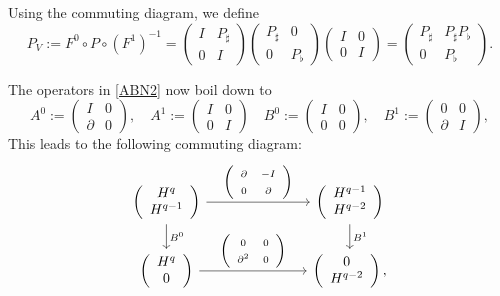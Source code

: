 \documentclass[11pt]{amsart}
\newcommand{\0}{\mathaccent23}
\begin{document}
Using the commuting diagram, we define 
$$
P_{V}:=F^{0}\circ P\circ (F^{1})^{-1}=\left (
\begin{array}{cc}
I & P_{\sharp}\\
0 & I
\end{array}
\right )\left (
\begin{array}{cc}
P_{\sharp} & 0\\
0 & P_{\flat}
\end{array}
\right )\left (
\begin{array}{cc}
I & 0\\
0 & I
\end{array}
\right )=\left (
\begin{array}{cc}
P_{\sharp} & P_{\sharp}P_{\flat}\\
0 & P_{\flat}
\end{array}
\right ).
$$

The operators in \eqref{ABN2} now boil down to
$$A^{0}:=
\left (
\begin{array}{cc}
I & 0\\
\partial & 0
\end{array}
\right ), \quad 
A^{1}:=
\left (
\begin{array}{cc}
I & 0\\
0 & I
\end{array}
\right )\quad 
B^{0}:=
\left (
\begin{array}{cc}
I & 0\\
0 & 0
\end{array}
\right ), \quad 
B^{1}:=
\left (
\begin{array}{cc}
0 & 0\\
\partial & I
\end{array}
\right ),
$$
This leads to the following commuting diagram:
\begin{equation}\label{BGG-1D-iso}
\begin{tikzcd}[ampersand replacement=\&, column sep=1in]
\left (
\begin{array}{c}
H^{q}\\
H^{q-1} 
\end{array}
\right )\arrow{d}{B^{0}} \arrow{r}{\left (
\begin{array}{cc}
\partial &-I\\
0&\partial
\end{array}
\right ) } \&\left (
\begin{array}{c}
H^{q-1} \\
H^{q-2} 
\end{array}
\right )\arrow{d}{B^{1}}  
\\
\left (
\begin{array}{c}
H^{q}\\
0
\end{array}
\right ) \arrow{r}{\left (
\begin{array}{cc}
0 & 0\\
\partial^{2} & 0
\end{array}
\right ) } \&\left (
\begin{array}{c}
0 \\
H^{q-2} 
\end{array}
\right ),
 \end{tikzcd}
\end{equation}
\end{document}
